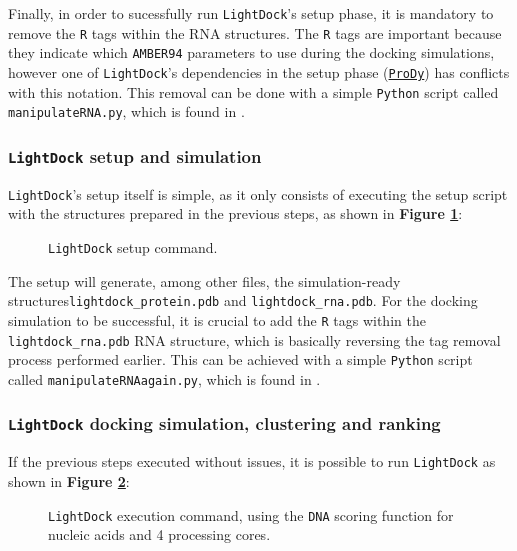 Finally, in order to sucessfully run \texttt{LightDock}'s setup phase, it is mandatory to remove the \texttt{R} tags within the RNA structures. The \texttt{R} tags are important because they indicate which \texttt{AMBER94} parameters to use during the docking simulations, however one of \texttt{LightDock}'s dependencies in the setup phase (\href{http://prody.csb.pitt.edu/}{\texttt{ProDy}}) has conflicts with this notation. This removal can be done with a simple \texttt{Python} script called \texttt{manipulateRNA.py}, which is found in \textbf{}.

\subsubsection{\texttt{LightDock} setup and simulation}

\texttt{LightDock}'s setup itself is simple, as it only consists of executing the setup script with the structures prepared in the previous steps, as shown in \textbf{Figure \ref{fig:lightdocksetup}}:

\begin{figure}[htbp!]
    
    \caption{\texttt{LightDock} setup command.}
    \label{fig:lightdocksetup}
\end{figure}

The setup will generate, among other files, the simulation-ready structures\linebreak \texttt{lightdock\_protein.pdb} and \texttt{lightdock\_rna.pdb}. For the docking simulation to be successful, it is crucial to add the \texttt{R} tags within the \texttt{lightdock\_rna.pdb} RNA structure, which is basically reversing the tag removal process performed earlier. This can be achieved with a simple \texttt{Python} script called \texttt{manipulateRNAagain.py}, which is found in \textbf{}.\\

\subsubsection{\texttt{LightDock} docking simulation, clustering and ranking}

If the previous steps executed without issues, it is possible to run \texttt{LightDock} as shown in \textbf{Figure \ref{fig:lightdockexec}}:

\begin{figure}[htbp!]
    
    \caption[\texttt{LightDock} execution command.]{\texttt{LightDock} execution command, using the \texttt{DNA} scoring function for nucleic acids and 4 processing cores.}
    \label{fig:lightdockexec}
\end{figure}

